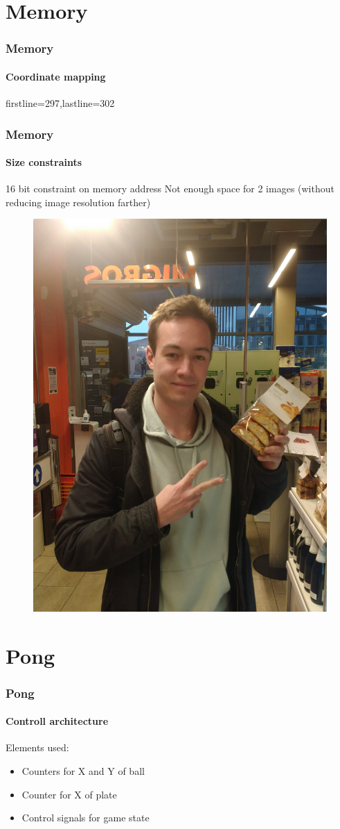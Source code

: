 \documentclass{beamer}
\begin{document}
\section{Memory}
\begin{frame}
    \sectionpage
\end{frame}

\begin{frame}[fragile]
    \frametitle{Memory}
    \framesubtitle{Coordinate mapping}
    
    firstline=297,lastline=302

\end{frame}



\begin{frame}
    \frametitle{Memory}
    \framesubtitle{Size constraints}
    \begin{alertblock}
        {16 bit constraint on memory address}
        Not enough space for 2 images (without reducing image resolution farther)
    \end{alertblock}
    \begin{figure}
        \includegraphics[width=.3\textwidth]{../_00FINAL_PROJECT/src/mandelbrot_und_so.jpg}
    \end{figure}
\end{frame}


\section{Pong}
\begin{frame}
    \sectionpage
\end{frame}

\begin{frame}
    \frametitle{Pong}
    \framesubtitle{Controll architecture}
    Elements used:
    \begin{itemize}
        \item Counters for X and Y of ball
        \item Counter for X of plate
        \item Control signals for game state
    \end{itemize}
\end{frame}
\end{document}
